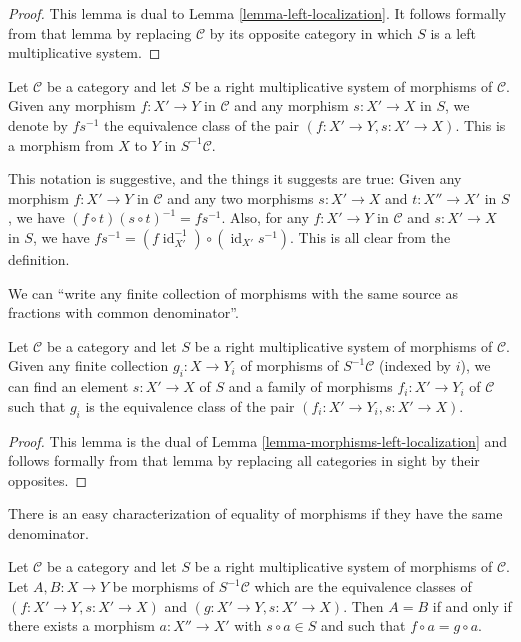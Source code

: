 \begin{proof}
This lemma is dual to
Lemma \ref{lemma-left-localization}.
It follows formally from that lemma by replacing
$\mathcal{C}$ by its opposite category in which
$S$ is a left multiplicative system.
\end{proof}

\begin{definition}
Let $\mathcal{C}$ be a category and let $S$ be a right multiplicative
system of morphisms of $\mathcal{C}$. Given any morphism
$f : X' \to Y$ in $\mathcal{C}$ and any morphism $s : X' \to X$ in
$S$, we denote by $f s^{-1}$ the equivalence class of the pair
$(f : X' \to Y, s : X' \to X)$. This is a morphism from $X$ to $Y$
in $S^{-1} \mathcal{C}$.

This notation is suggestive, and the things it suggests are true:
Given any morphism $f : X' \to Y$ in $\mathcal{C}$ and any two
morphisms $s : X' \to X$ and $t : X'' \to X'$ in $S$, we have
$\left(f \circ t\right) \left(s \circ t\right)^{-1} = f s^{-1}$.
Also, for any
$f : X' \to Y$ in $\mathcal{C}$ and $s : X' \to X$ in $S$, we have
$f s^{-1} = \left(f \operatorname{id}_{X'}^{-1}\right)
\circ \left(\operatorname{id}_{X'} s^{-1}\right)$. This is all clear
from the definition.
\end{definition}

\noindent
We can ``write any finite collection of morphisms with the same source
as fractions with common denominator''.

\begin{lemma}
\label{lemma-morphisms-right-localization}
Let $\mathcal{C}$ be a category and let $S$ be a right multiplicative
system of morphisms of $\mathcal{C}$. Given any finite collection
$g_i : X \to Y_i$ of morphisms of $S^{-1}\mathcal{C}$
(indexed by $i$),
we can find an element $s : X' \to X$ of $S$ and a family
of morphisms $f_i : X' \to Y_i$ of $\mathcal{C}$ such that
$g_i$ is the equivalence class of the pair
$(f_i : X' \to Y_i, s : X' \to X)$.
\end{lemma}

\begin{proof}
This lemma is the dual of
Lemma \ref{lemma-morphisms-left-localization}
and follows formally from that lemma by replacing all
categories in sight by their opposites.
\end{proof}

\noindent
There is an easy characterization of equality of morphisms if they
have the same denominator.

\begin{lemma}
\label{lemma-equality-morphisms-right-localization}
Let $\mathcal{C}$ be a category and let $S$ be a right multiplicative
system of morphisms of $\mathcal{C}$. Let $A, B : X \to Y$ be
morphisms of $S^{-1}\mathcal{C}$ which are the equivalence
classes of $(f : X' \to Y, s : X' \to X)$ and
$(g : X' \to Y, s : X' \to X)$. Then
$A = B$ if and only if there exists a morphism
$a : X'' \to X'$ with $s \circ a \in S$ and
such that $f \circ a = g \circ a$.
\end{lemma}

